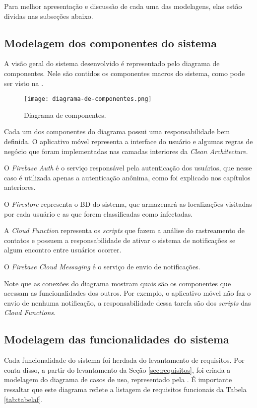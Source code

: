 Para melhor apresentação e discussão de cada uma das modelagens, elas estão dividas nas subseções abaixo.

\subsection{Modelagem dos componentes do sistema}
A visão geral do sistema desenvolvido é representado pelo diagrama de componentes. Nele são contidos os componentes macros do sistema, como pode ser visto na .

\begin{figure}[!htb]
  \centering
  \texttt{[image: diagrama-de-componentes.png]}
  \caption{Diagrama de componentes.}
  \label{fig:diagramacomponentes}
\end{figure}

Cada um dos componentes do diagrama possui uma responsabilidade bem definida. O aplicativo móvel representa a interface do usuário e algumas regras de negócio que foram implementadas nas camadas interiores da \textit{Clean Architecture}.

O \textit{Firebase Auth} é o serviço responsável pela autenticação dos usuários, que nesse caso é utilizada apenas a autenticação anônima, como foi explicado nos capítulos anteriores.

O \textit{Firestore} representa o BD do sistema, que armazenará as localizações visitadas por cada usuário e as que forem classificadas como infectadas.

A \textit{Cloud Function} representa os \textit{scripts} que fazem a análise do rastreamento de contatos e possuem a responsabilidade de ativar o sistema de notificações se algum encontro entre usuários ocorrer.

O \textit{Firebase Cloud Messaging} é o serviço de envio de notificações.

Note que as conexões do diagrama mostram quais são os componentes que acessam as funcionalidades dos outros. Por exemplo, o aplicativo móvel não faz o envio de nenhuma notificação, a responsabilidade dessa tarefa são dos \textit{scripts} das \textit{Cloud Functions}.

\subsection{Modelagem das funcionalidades do sistema}
Cada funcionalidade do sistema foi herdada do levantamento de requisitos. Por conta disso, a partir do levantamento da Seção \ref{sec:requisitos}, foi criada a modelagem do diagrama de casos de uso, representado pela . É importante ressaltar que este diagrama reflete a listagem de requisitos funcionais da Tabela \ref{tab:tabelaf}.

